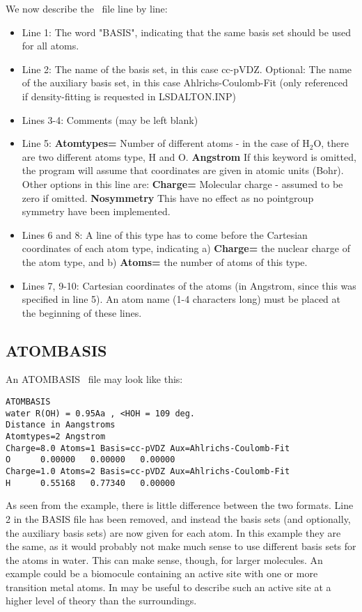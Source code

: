 We now describe the \mol\ file line by line:
\begin{itemize}
\item Line 1: The word "BASIS", indicating that the same basis set should be used for all 
atoms.
\item Line 2: The name of the basis set, in this case cc-pVDZ. Optional: The name
of the auxiliary basis set, in this case Ahlrichs-Coulomb-Fit
(only referenced if density-fitting is requested in LSDALTON.INP)
\item Lines 3-4: Comments (may be left blank)
\item Line 5: {\bf Atomtypes=} Number of different atoms - in the case of H$_2$O, there are two different
atoms type, H and O. {\bf Angstrom} If this keyword is omitted, the program will assume that coordinates
are given in atomic units (Bohr). Other options in this line are:
{\bf Charge=} Molecular charge - assumed to be zero if omitted. 
{\bf Nosymmetry} This have no effect as no pointgroup symmetry have been implemented. 
\item Lines 6 and 8: A line of this type has to come before the Cartesian coordinates of each atom
type, indicating a) {\bf Charge=} the nuclear charge of the atom type, and b) {\bf Atoms=} the number of atoms of this type.
\item Lines 7, 9-10: Cartesian coordinates of the atoms (in Angstrom, since this was specified 
in line 5). An atom name (1-4 characters long) must be placed at the beginning of these lines.
\end{itemize}

\subsection{ATOMBASIS}

An ATOMBASIS \mol\ file may look like this:
\begin{verbatim}
ATOMBASIS
water R(OH) = 0.95Aa , <HOH = 109 deg.
Distance in Aangstroms
Atomtypes=2 Angstrom
Charge=8.0 Atoms=1 Basis=cc-pVDZ Aux=Ahlrichs-Coulomb-Fit
O      0.00000   0.00000   0.00000
Charge=1.0 Atoms=2 Basis=cc-pVDZ Aux=Ahlrichs-Coulomb-Fit
H      0.55168   0.77340   0.00000
\end{verbatim} 
As seen from the example, there is little difference between the two
formats. Line 2 in the BASIS file has been removed, and instead the basis
sets (and optionally, the auxiliary basis sets) are now given for each
atom. In this example they are the same, as it would probably not make
much sense to use different basis sets for the atoms in water. This can
make sense, though, for larger molecules. An example could be a biomocule containing
an active site with one or more transition metal atoms. In may be useful to
describe such an active site at a higher level of theory than the surroundings. 


